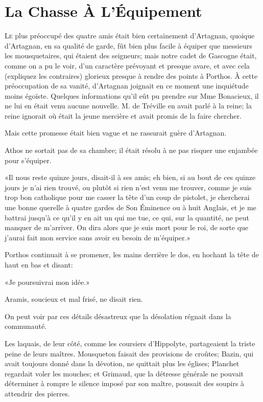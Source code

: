 
\chapter{La Chasse À L'Équipement}

\lettrine{L}{e} plus préoccupé des quatre amis était bien certainement d'Artagnan, quoique d'Artagnan, en sa qualité de garde, fût bien plus facile à équiper que messieurs les mousquetaires, qui étaient des seigneurs; mais notre cadet de Gascogne était, comme on a pu le voir, d'un caractère prévoyant et presque avare, et avec cela (expliquez les contraires) glorieux presque à rendre des points à Porthos. À cette préoccupation de sa vanité, d'Artagnan joignait en ce moment une inquiétude moins égoïste. Quelques informations qu'il eût pu prendre sur Mme Bonacieux, il ne lui en était venu aucune nouvelle. M. de Tréville en avait parlé à la reine; la reine ignorait où était la jeune mercière et avait promis de la faire chercher. 

Mais cette promesse était bien vague et ne rassurait guère d'Artagnan. 

Athos ne sortait pas de sa chambre; il était résolu à ne pas risquer une enjambée pour s'équiper. 

«Il nous reste quinze jours, disait-il à ses amis; eh bien, si au bout de ces quinze jours je n'ai rien trouvé, ou plutôt si rien n'est venu me trouver, comme je suis trop bon catholique pour me casser la tête d'un coup de pistolet, je chercherai une bonne querelle à quatre gardes de Son Éminence ou à huit Anglais, et je me battrai jusqu'à ce qu'il y en ait un qui me tue, ce qui, sur la quantité, ne peut manquer de m'arriver. On dira alors que je suis mort pour le roi, de sorte que j'aurai fait mon service sans avoir eu besoin de m'équiper.» 

Porthos continuait à se promener, les mains derrière le dos, en hochant la tête de haut en bas et disant: 

«Je poursuivrai mon idée.» 

Aramis, soucieux et mal frisé, ne disait rien. 

On peut voir par ces détails désastreux que la désolation régnait dans la communauté. 

Les laquais, de leur côté, comme les coursiers d'Hippolyte, partageaient la triste peine de leurs maîtres. Mousqueton faisait des provisions de croûtes; Bazin, qui avait toujours donné dans la dévotion, ne quittait plus les églises; Planchet regardait voler les mouches; et Grimaud, que la détresse générale ne pouvait déterminer à rompre le silence imposé par son maître, poussait des soupirs à attendrir des pierres. 

